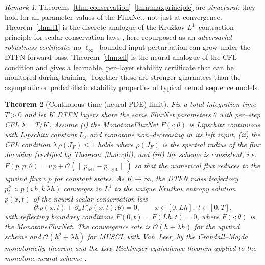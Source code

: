 \documentclass[10pt]{article}
\newtheorem{theorem}{Theorem}
\theoremstyle{definition}
\theoremstyle{remark}
\newtheorem{remark}[theorem]{Remark}
\begin{document}
\begin{remark}
  Theorems~\ref{thm:conservation}--\ref{thm:maxprinciple} are
  \emph{structural}: they hold for all parameter values of the
  FluxNet, not just at convergence.  Theorem~\ref{thm:l1} is the
  discrete analogue of the Kru\v{z}kov $L^1$--contraction principle
  for scalar conservation laws \cite{kruzkov1970first}, here
  repurposed as an \emph{adversarial robustness certificate}: no
  $\ell_\infty$--bounded input perturbation can grow under the DTFN
  forward pass.  Theorem~\ref{thm:cfl} is the neural analogue of the
  CFL condition and gives a learnable, per--layer stability
  certificate that can be monitored during training.  Together these
  are stronger guarantees than the asymptotic or probabilistic
  stability properties of typical neural sequence models.
\end{remark}

\begin{theorem}[Continuous--time (neural PDE) limit]
  \label{thm:pde}
  Fix a total integration time $T > 0$ and let $K$ DTFN layers share
  the same FluxNet parameters $\theta$ with per--step CFL
  $\lambda = T/K$.  Assume (i) the MonotoneFluxNet $F(\cdot;\theta)$
  is Lipschitz continuous with Lipschitz constant $L_F$ and monotone
  non--decreasing in its left input, (ii) the CFL condition
  $\lambda\,\rho(J_F) \le 1$ holds where $\rho(J_F)$ is the spectral
  radius of the flux Jacobian (certified by Theorem~\ref{thm:cfl}), and
  (iii) the scheme is consistent, i.e.\ $F(p,p;\theta) = v\,p +
  \mathcal{O}(\|p_{\text{left}}-p_{\text{right}}\|)$ so that the
  numerical flux reduces to the upwind flux $v\,p$ for constant
  states.  As $K \to \infty$, the DTFN mass trajectory
  $p^k_i \approx p(i\,h, k\,\lambda h)$ converges in $L^1$ to the
  unique Kru\v{z}kov entropy solution $p(x, t)$ of the neural scalar
  conservation law
  \[
    \partial_t p(x, t) + \partial_x F\bigl(p(x, t); \theta\bigr) = 0,
    \qquad x \in [0, L h],\; t \in [0, T],
  \]
  with reflecting boundary conditions
  $F(0, t) = F(L h, t) = 0$, where $F(\cdot; \theta)$ is the
  MonotoneFluxNet.  The convergence rate is
  $\mathcal{O}(h + \lambda h)$ for the upwind scheme and
  $\mathcal{O}(h^2 + \lambda h)$ for MUSCL with Van~Leer, by the
  Crandall--Majda monotonicity theorem \cite{crandall1980monotone}
  and the Lax--Richtmyer equivalence theorem applied to the monotone
  neural scheme \cite{leveque2002finite}.
\end{theorem}
\end{document}
